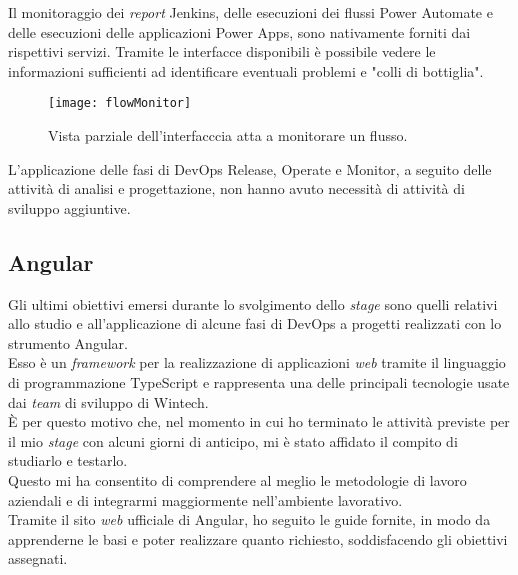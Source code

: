 Il monitoraggio dei \emph{report} Jenkins, delle esecuzioni dei flussi Power Automate e delle esecuzioni delle applicazioni Power Apps, sono nativamente forniti dai rispettivi servizi.
Tramite le interfacce disponibili è possibile vedere le informazioni sufficienti ad identificare eventuali problemi e "colli di bottiglia".
\begin{figure}[htbp] 
    \centering 
    \texttt{[image: flowMonitor]} 
    \caption{Vista parziale dell'interfacccia atta a monitorare un flusso.}
    \label{fig:flowMonitor}
\end{figure}

L'applicazione delle fasi di \gls{DevOps} Release, Operate e Monitor, a seguito delle attività di analisi e progettazione, non hanno avuto necessità di attività di sviluppo aggiuntive. 


\subsection{Angular}

Gli ultimi obiettivi emersi durante lo svolgimento dello \emph{stage} sono quelli relativi allo studio e all'applicazione di alcune fasi di \gls{DevOps} a progetti realizzati con lo strumento Angular.\\
Esso è un \emph{framework} per la realizzazione di applicazioni \emph{web} tramite il linguaggio di programmazione TypeScript e rappresenta una delle principali tecnologie usate dai \emph{team} di sviluppo di Wintech.\\
È per questo motivo che, nel momento in cui ho terminato le attività previste per il mio \emph{stage} con alcuni giorni di anticipo, mi è stato affidato il compito di studiarlo e testarlo.\\
Questo mi ha consentito di comprendere al meglio le metodologie di lavoro aziendali e di integrarmi maggiormente nell'ambiente lavorativo.\\
Tramite il sito \emph{web} ufficiale di Angular, ho seguito le guide fornite, in modo da apprenderne le basi e poter realizzare quanto richiesto, soddisfacendo gli obiettivi assegnati.\\


